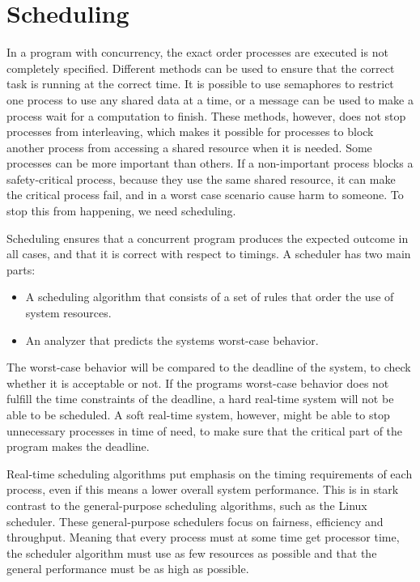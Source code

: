 \section{Scheduling}
In a program with concurrency, the exact order processes are executed is not completely specified. Different methods can be used to ensure that the correct task is running at the correct time. It is possible to use semaphores to restrict one process to use any shared data at a time, or a message can be used to make a process wait for a computation to finish. These methods, however, does not stop processes from interleaving, which makes it possible for processes to block another process from accessing a shared resource when it is needed. Some processes can be more important than others. If a non-important process blocks a safety-critical process, because they use the same shared resource, it can make the critical process fail, and in a worst case scenario cause harm to someone. To stop this from happening, we need scheduling\cite{rts-book}.

Scheduling ensures that a concurrent program produces the expected outcome in all cases, and that it is correct with respect to timings. A scheduler has two main parts: 

\begin{itemize}
\item A scheduling algorithm that consists of a set of rules that order the use of system resources.
\item An analyzer that predicts the systems worst-case behavior.
\end{itemize}

The worst-case behavior will be compared to the deadline of the system, to check whether it is acceptable or not. If the programs worst-case behavior does not fulfill the time constraints of the deadline, a hard real-time system will not be able to be scheduled. A soft real-time system, however, might be able to stop unnecessary processes in time of need, to make sure that the critical part of the program makes the deadline.

Real-time scheduling algorithms put emphasis on the timing requirements of each process, even if this means a lower overall system performance. This is in stark contrast to the general-purpose scheduling algorithms, such as the Linux scheduler. These general-purpose schedulers focus on fairness, efficiency and throughput. Meaning that every process must at some time get processor time, the scheduler algorithm must use as few resources as possible and that the general performance must be as high as possible.

